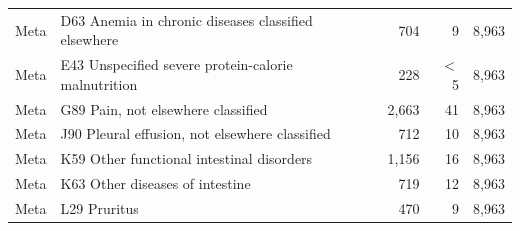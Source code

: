 \begin{tabular}{lp{}rrr}
Meta & D63 Anemia in chronic diseases classified elsewhere & 704 & 9 & 8,963 \\
Meta & E43 Unspecified severe protein-calorie malnutrition & 228 & $<$5 & 8,963 \\
Meta & G89 Pain, not elsewhere classified & 2,663 & 41 & 8,963 \\
Meta & J90 Pleural effusion, not elsewhere classified & 712 & 10 & 8,963 \\
Meta & K59 Other functional intestinal disorders & 1,156 & 16 & 8,963 \\
Meta & K63 Other diseases of intestine & 719 & 12 & 8,963 \\
Meta & L29 Pruritus & 470 & 9 & 8,963 \\
\hline
\end{tabular}
